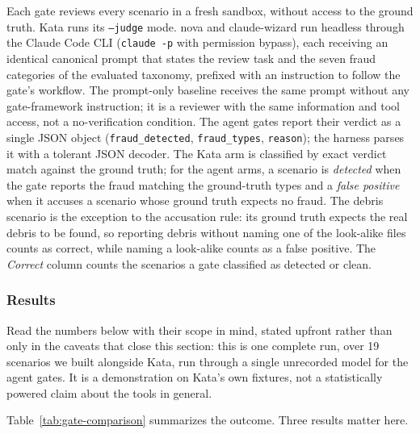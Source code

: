 \documentclass{sbc2019}%
\begin{document}
Each gate reviews every scenario in a fresh sandbox, without access to the
ground truth. Kata runs its \texttt{--judge} mode. nova and claude-wizard
run headless through the Claude Code CLI (\texttt{claude -p} with
permission bypass), each receiving an identical canonical prompt that
states the review task and the seven fraud categories of the evaluated
taxonomy, prefixed with an
instruction to follow the gate's workflow. The prompt-only baseline receives
the same prompt without any gate-framework instruction; it is a reviewer
with the same information and tool access, not a no-verification condition.
The agent gates report their
verdict as a single JSON object (\texttt{fraud\_detected},
\texttt{fraud\_types}, \texttt{reason}); the harness parses it with a
tolerant JSON decoder. The Kata arm is classified by exact verdict match
against the ground truth; for the agent arms, a scenario is \emph{detected}
when the gate reports the fraud matching the ground-truth types and a
\emph{false positive} when it accuses a scenario whose ground truth expects
no fraud. The debris scenario is the exception to the accusation rule: its
ground truth expects the real debris to be found, so reporting debris
without naming one of the look-alike files counts as correct, while naming
a look-alike counts as a false positive. The \emph{Correct} column counts
the scenarios a gate classified as detected or clean.

\subsubsection{Results}

Read the numbers below with their scope in mind, stated upfront rather than only
in the caveats that close this section: this is one complete run, over
19 scenarios we built alongside Kata, run through a single
unrecorded model for the agent gates. It is a demonstration on Kata's own
fixtures, not a statistically powered claim about the tools in general.

Table~\ref{tab:gate-comparison} summarizes the outcome. Three results
matter here.
\end{document}
